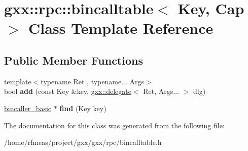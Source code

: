 \hypertarget{classgxx_1_1rpc_1_1bincalltable}{}\section{gxx\+:\+:rpc\+:\+:bincalltable$<$ Key, Cap $>$ Class Template Reference}
\label{classgxx_1_1rpc_1_1bincalltable}
\subsection*{Public Member Functions}
\begin{DoxyCompactItemize}
\item 
{\footnotesize template$<$typename Ret , typename... Args$>$ }\\bool {\bfseries add} (const Key \&key, \hyperlink{classgxx_1_1delegate}{gxx\+::delegate}$<$ Ret, Args... $>$ dlg)\hypertarget{classgxx_1_1rpc_1_1bincalltable_ad3d4323571c776add3aef1421994af4a}{}\label{classgxx_1_1rpc_1_1bincalltable_ad3d4323571c776add3aef1421994af4a}

\item 
\hyperlink{classgxx_1_1rpc_1_1bincaller__basic}{bincaller\+\_\+basic} $\ast$ {\bfseries find} (Key key)\hypertarget{classgxx_1_1rpc_1_1bincalltable_a88d1dbdb7640ef93f8d0af3c5ca25c44}{}\label{classgxx_1_1rpc_1_1bincalltable_a88d1dbdb7640ef93f8d0af3c5ca25c44}

\end{DoxyCompactItemize}


The documentation for this class was generated from the following file\+:\begin{DoxyCompactItemize}
\item 
/home/rfmeas/project/gxx/gxx/rpc/bincalltable.\+h\end{DoxyCompactItemize}
